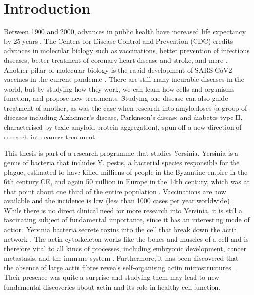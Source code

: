 \chapter{Introduction}
Between 1900 and 2000, advances in public health have increased life expectancy by 25 years \cite{Bunker1994}. The Centers for Disease Control and Prevention (CDC) credits advances in molecular biology such as vaccinations, better prevention of infectious diseases, better treatment of coronary heart disease and stroke, and more \cite{CDC1999}. Another pillar of molecular biology is the rapid development of SARS-CoV2 vaccines in the current pandemic \cite{Sadoff2021, Polack2020}. There are still many incurable diseases in the world, but by studying how they work, we can learn how cells and organisms function, and propose new treatments. Studying one disease can also guide treatment of another, as was the case when research into amyloidoses (a group of diseases including Alzheimer's disease, Parkinson's disease and diabetes type II, characterised by toxic amyloid protein aggregation), spun off a new direction of research into cancer treatment \cite{Gallardo2016}.

This thesis is part of a research programme that studies Yersinia. Yersinia is a genus of bacteria that includes Y. pestis, a bacterial species responsible for the plague, estimated to have killed millions of people in the Byzantine empire in the 6th century CE, and again 50 million in Europe in the 14th century, which was at that point about one third of the entire population \cite{Zietz2004}. Vaccinations are now available and the incidence is low (less than 1000 cases per year worldwide) \cite{WHO2014}. 
While there is no direct clinical need for more research into Yersinia, it is still a fascinating subject of fundamental importance, since it has an interesting mode of action. Yersinia bacteria secrete toxins into the cell that break down the actin network \cite{Ono2017}. The actin cytoskeleton works like the bones and muscles of a cell and is therefore vital to all kinds of processes, including embryonic development, cancer metastasis, and the immune system \cite{molbio, Horwitz2003, Umeda2016, Barnat2017, Lin2017}. Furthermore, it has been discovered that the absence of large actin fibres reveals self-organising actin microstructures \cite{Fritzsche2017a}. Their presence was quite a surprise and studying them may lead to new fundamental discoveries about actin and its role in healthy cell function.

